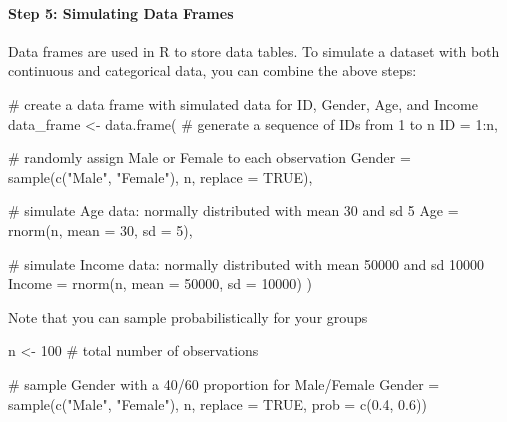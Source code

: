 \documentclass[
  singlecolumn]{article}
\let\oldparagraph\paragraph
\renewcommand{\paragraph}[1]{\oldparagraph{#1}\mbox{}}
\newenvironment{Shaded}{}{}
\newcommand{\AttributeTok}[1]{\textcolor[rgb]{0.84,0.23,0.29}{#1}}
\newcommand{\CommentTok}[1]{\textcolor[rgb]{0.42,0.45,0.49}{#1}}
\newcommand{\ConstantTok}[1]{\textcolor[rgb]{0.00,0.36,0.77}{#1}}
\newcommand{\DecValTok}[1]{\textcolor[rgb]{0.00,0.36,0.77}{#1}}
\newcommand{\FloatTok}[1]{\textcolor[rgb]{0.00,0.36,0.77}{#1}}
\newcommand{\FunctionTok}[1]{\textcolor[rgb]{0.44,0.26,0.76}{#1}}
\newcommand{\NormalTok}[1]{\textcolor[rgb]{0.14,0.16,0.18}{#1}}
\newcommand{\OtherTok}[1]{\textcolor[rgb]{0.44,0.26,0.76}{#1}}
\newcommand{\SpecialCharTok}[1]{\textcolor[rgb]{0.00,0.36,0.77}{#1}}
\newcommand{\StringTok}[1]{\textcolor[rgb]{0.01,0.18,0.38}{#1}}
\theoremstyle{definition}
\theoremstyle{remark}
\begin{document}
\paragraph{Step 5: Simulating Data
Frames}\label{step-5-simulating-data-frames}

Data frames are used in R to store data tables. To simulate a dataset
with both continuous and categorical data, you can combine the above
steps:

\begin{Shaded}
\begin{Highlighting}[]
\CommentTok{\# create a data frame with simulated data for ID, Gender, Age, and Income}
\NormalTok{data\_frame }\OtherTok{\textless{}{-}} \FunctionTok{data.frame}\NormalTok{(}
  \CommentTok{\# generate a sequence of IDs from 1 to n}
  \AttributeTok{ID =} \DecValTok{1}\SpecialCharTok{:}\NormalTok{n,}
  
  \CommentTok{\# randomly assign \textquotesingle{}Male\textquotesingle{} or \textquotesingle{}Female\textquotesingle{} to each observation}
  \AttributeTok{Gender =} \FunctionTok{sample}\NormalTok{(}\FunctionTok{c}\NormalTok{(}\StringTok{"Male"}\NormalTok{, }\StringTok{"Female"}\NormalTok{), n, }\AttributeTok{replace =} \ConstantTok{TRUE}\NormalTok{),}
  
  \CommentTok{\# simulate \textquotesingle{}Age\textquotesingle{} data: normally distributed with mean 30 and sd 5}
  \AttributeTok{Age =} \FunctionTok{rnorm}\NormalTok{(n, }\AttributeTok{mean =} \DecValTok{30}\NormalTok{, }\AttributeTok{sd =} \DecValTok{5}\NormalTok{),}
  
  \CommentTok{\# simulate \textquotesingle{}Income\textquotesingle{} data: normally distributed with mean 50000 and sd 10000}
  \AttributeTok{Income =} \FunctionTok{rnorm}\NormalTok{(n, }\AttributeTok{mean =} \DecValTok{50000}\NormalTok{, }\AttributeTok{sd =} \DecValTok{10000}\NormalTok{)}
\NormalTok{)}
\end{Highlighting}
\end{Shaded}

Note that you can sample probabilistically for your groups

\begin{Shaded}
\begin{Highlighting}[]
\NormalTok{n }\OtherTok{\textless{}{-}} \DecValTok{100} \CommentTok{\# total number of observations}

\CommentTok{\# sample \textquotesingle{}Gender\textquotesingle{} with a 40/60 proportion for Male/Female}
\NormalTok{Gender }\OtherTok{=} \FunctionTok{sample}\NormalTok{(}\FunctionTok{c}\NormalTok{(}\StringTok{"Male"}\NormalTok{, }\StringTok{"Female"}\NormalTok{), n, }\AttributeTok{replace =} \ConstantTok{TRUE}\NormalTok{, }\AttributeTok{prob =} \FunctionTok{c}\NormalTok{(}\FloatTok{0.4}\NormalTok{, }\FloatTok{0.6}\NormalTok{))}
\end{Highlighting}
\end{Shaded}
\end{document}
